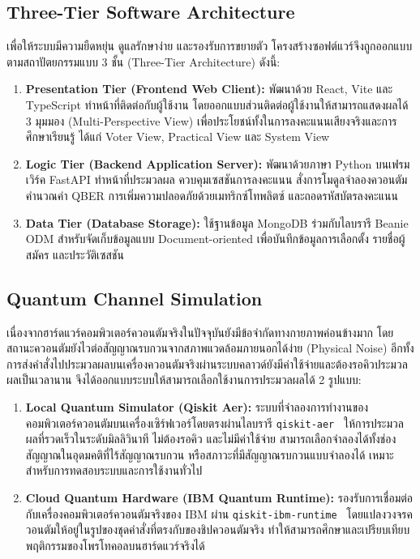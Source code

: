 \subsection{Three-Tier Software Architecture}
เพื่อให้ระบบมีความยืดหยุ่น ดูแลรักษาง่าย และรองรับการขยายตัว โครงสร้างซอฟต์แวร์จึงถูกออกแบบตามสถาปัตยกรรมแบบ 3 ชั้น (Three-Tier Architecture) ดังนี้:
\begin{enumerate}
    \item \textbf{Presentation Tier (Frontend Web Client):} พัฒนาด้วย React, Vite และ TypeScript ทำหน้าที่ติดต่อกับผู้ใช้งาน โดยออกแบบส่วนติดต่อผู้ใช้งานให้สามารถแสดงผลได้ 3 มุมมอง (Multi-Perspective View) เพื่อประโยชน์ทั้งในการลงคะแนนเสียงจริงและการศึกษาเรียนรู้ ได้แก่ Voter View, Practical View และ System View
    \item \textbf{Logic Tier (Backend Application Server):} พัฒนาด้วยภาษา Python บนเฟรมเวิร์ค FastAPI ทำหน้าที่ประมวลผล ควบคุมเซสชันการลงคะแนน สั่งการโมดูลจำลองควอนตัม คำนวณค่า QBER การเพิ่มความปลอดภัยด้วยเมทริกซ์โทพลิตซ์ และถอดรหัสบัตรลงคะแนน
    \item \textbf{Data Tier (Database Storage):} ใช้ฐานข้อมูล MongoDB ร่วมกับไลบรารี Beanie ODM สำหรับจัดเก็บข้อมูลแบบ Document-oriented เพื่อบันทึกข้อมูลการเลือกตั้ง รายชื่อผู้สมัคร และประวัติเซสชัน
\end{enumerate}

\subsection{Quantum Channel Simulation}
เนื่องจากฮาร์ดแวร์คอมพิวเตอร์ควอนตัมจริงในปัจจุบันยังมีข้อจำกัดทางกายภาพค่อนข้างมาก โดยสถานะควอนตัมยังไวต่อสัญญาณรบกวนจากสภาพแวดล้อมภายนอกได้ง่าย (Physical Noise) อีกทั้งการส่งคำสั่งไปประมวลผลบนเครื่องควอนตัมจริงผ่านระบบคลาวด์ยังมีค่าใช้จ่ายและต้องรอคิวประมวลผลเป็นเวลานาน จึงได้ออกแบบระบบให้สามารถเลือกใช้งานการประมวลผลได้ 2 รูปแบบ:
\begin{enumerate}
    \item \textbf{Local Quantum Simulator (Qiskit Aer):} ระบบที่จำลองการทำงานของคอมพิวเตอร์ควอนตัมบนเครื่องเซิร์ฟเวอร์โดยตรงผ่านไลบรารี \texttt{qiskit-aer}~\cite{qiskit_aer} ให้การประมวลผลที่รวดเร็วในระดับมิลลิวินาที ไม่ต้องรอคิว และไม่มีค่าใช้จ่าย สามารถเลือกจำลองได้ทั้งช่องสัญญาณในอุดมคติที่ไร้สัญญาณรบกวน หรือสภาวะที่มีสัญญาณรบกวนแบบจำลองได้ เหมาะสำหรับการทดสอบระบบและการใช้งานทั่วไป
    \item \textbf{Cloud Quantum Hardware (IBM Quantum Runtime):} รองรับการเชื่อมต่อกับเครื่องคอมพิวเตอร์ควอนตัมจริงของ IBM ผ่าน \texttt{qiskit-ibm-runtime}~\cite{qiskit_ibm_runtime} โดยแปลงวงจรควอนตัมให้อยู่ในรูปของชุดคำสั่งที่ตรงกับของชิปควอนตัมจริง ทำให้สามารถศึกษาและเปรียบเทียบพฤติกรรมของโพรโทคอลบนฮาร์ดแวร์จริงได้
\end{enumerate}

